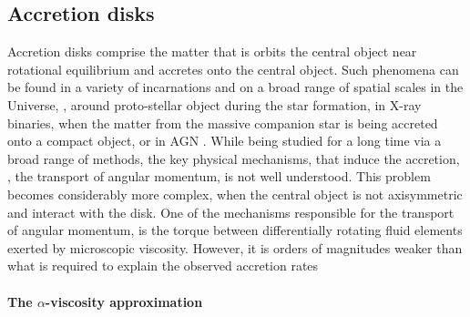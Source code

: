

\subsection{Accretion disks}

Accretion disks comprise the matter that is orbits the central object near rotational 
equilibrium and accretes onto the central object. Such phenomena can be found in a variety of 
incarnations and on a broad range of spatial scales in the Universe, \eg, around proto-stellar
object during the star formation, in X-ray binaries, when the matter from the massive 
companion star is being accreted onto a compact object, or in \ac{AGN}
\cite{see e.g. Pringle, 1981; Balbus & Hawley, 1998; Spruit, 2010a, for reviews}.
While being studied for a long time via a broad range of methods, the key physical mechanisms, 
that induce the accretion, \ie, the transport of angular momentum, is not well understood.
This problem becomes considerably more complex, when the central object is not axisymmetric 
and interact with the disk. 
One of the mechanisms responsible for the transport of angular momentum, is the torque between
differentially rotating fluid elements exerted by microscopic viscosity. However, it is 
orders of magnitudes weaker than what is required to explain the observed accretion rates 
\cite{e.g. Lust, 1952} 

\paragraph{The $\alpha$-viscosity approximation}

